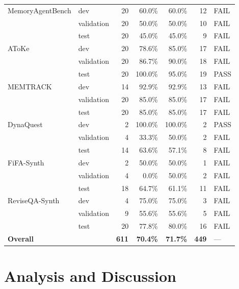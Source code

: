 \documentclass[11pt,a4paper]{article}
\begin{document}
\begin{table}[H]
\begin{tabular}{llrrrrl}
\midrule
MemoryAgentBench   & dev        & 20 &  60.0\% &  60.0\% & 12 & FAIL \\
                   & validation & 20 &  50.0\% &  50.0\% & 10 & FAIL \\
                   & test       & 20 &  45.0\% &  45.0\% &  9 & FAIL \\
\midrule
AToKe              & dev        & 20 &  78.6\% &  85.0\% & 17 & FAIL \\
                   & validation & 20 &  86.7\% &  90.0\% & 18 & FAIL \\
                   & test       & 20 & 100.0\% &  95.0\% & 19 & \textcolor{passgreen}{PASS} \\
\midrule
MEMTRACK           & dev        & 14 &  92.9\% &  92.9\% & 13 & FAIL \\
                   & validation & 20 &  85.0\% &  85.0\% & 17 & FAIL \\
                   & test       & 20 &  85.0\% &  85.0\% & 17 & FAIL \\
\midrule
DynaQuest          & dev        &  2 & 100.0\% & 100.0\% &  2 & \textcolor{passgreen}{PASS} \\
                   & validation &  4 &  33.3\% &  50.0\% &  2 & FAIL \\
                   & test       & 14 &  63.6\% &  57.1\% &  8 & FAIL \\
\midrule
FiFA-Synth         & dev        &  2 &  50.0\% &  50.0\% &  1 & FAIL \\
                   & validation &  4 &   0.0\% &  50.0\% &  2 & FAIL \\
                   & test       & 18 &  64.7\% &  61.1\% & 11 & FAIL \\
\midrule
ReviseQA-Synth     & dev        &  4 &  75.0\% &  75.0\% &  3 & FAIL \\
                   & validation &  9 &  55.6\% &  55.6\% &  5 & FAIL \\
                   & test       & 20 &  77.8\% &  80.0\% & 16 & FAIL \\
\midrule
\multicolumn{2}{l}{\textbf{Overall}} & \textbf{611} & \textbf{70.4\%} & \textbf{71.7\%} & \textbf{449} & --- \\
\bottomrule
\end{tabular}
\end{table}


\section{Analysis and Discussion}
\label{sec:analysis}
\end{document}
